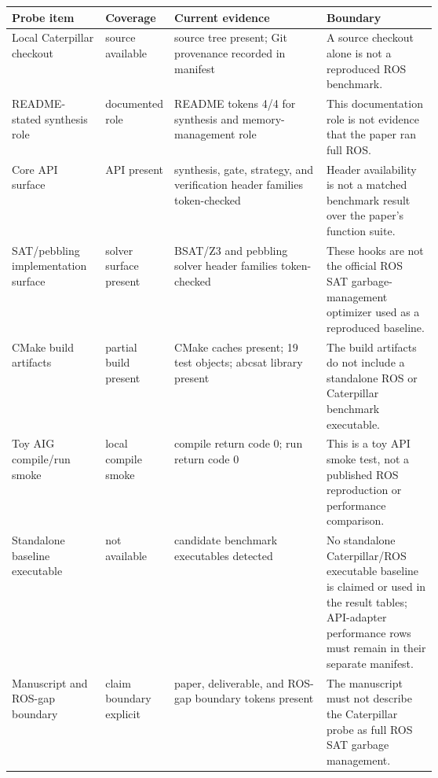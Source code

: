 \begin{tabularx}{\linewidth}{>{\raggedright\arraybackslash}p{0.22\linewidth}>{\raggedright\arraybackslash}p{0.15\linewidth}>{\raggedright\arraybackslash}X>{\raggedright\arraybackslash}p{0.26\linewidth}}
\toprule
Probe item & Coverage & Current evidence & Boundary \\
\midrule
Local Caterpillar checkout & source available & source tree present; Git provenance recorded in manifest & A source checkout alone is not a reproduced ROS benchmark. \\
README-stated synthesis role & documented role & README tokens 4/4 for synthesis and memory-management role & This documentation role is not evidence that the paper ran full ROS. \\
Core API surface & API present & 4 synthesis, gate, strategy, and verification header families token-checked & Header availability is not a matched benchmark result over the paper's function suite. \\
SAT/pebbling implementation surface & solver surface present & 3 BSAT/Z3 and pebbling solver header families token-checked & These hooks are not the official ROS SAT garbage-management optimizer used as a reproduced baseline. \\
CMake build artifacts & partial build present & CMake caches present; 19 test objects; abcsat library present & The build artifacts do not include a standalone ROS or Caterpillar benchmark executable. \\
Toy AIG compile/run smoke & local compile smoke & compile return code 0; run return code 0 & This is a toy API smoke test, not a published ROS reproduction or performance comparison. \\
Standalone baseline executable & not available & 0 candidate benchmark executables detected & No standalone Caterpillar/ROS executable baseline is claimed or used in the result tables; API-adapter performance rows must remain in their separate manifest. \\
Manuscript and ROS-gap boundary & claim boundary explicit & paper, deliverable, and ROS-gap boundary tokens present & The manuscript must not describe the Caterpillar probe as full ROS SAT garbage management. \\
\bottomrule
\end{tabularx}
